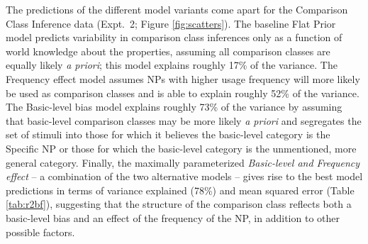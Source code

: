 \documentclass[doc]{apa6}
\begin{document}
The predictions of the different model variants come apart for the Comparison Class Inference data (Expt.~2; Figure \ref{fig:scatters}). 
The baseline Flat Prior model predicts variability in comparison class inferences only as a function of world knowledge about the properties, assuming all comparison classes are equally likely \emph{a priori}; this model explains roughly 17\% of the variance.
The Frequency effect model assumes NPs with higher usage frequency will more likely be used as comparison classes and is able to explain roughly 52\% of the variance.
The Basic-level bias model explains roughly 73\% of the variance by assuming that basic-level comparison classes may be more likely \emph{a priori} and segregates the set of stimuli into those for which it believes the basic-level category is the Specific NP or those for which the basic-level category is the unmentioned, more general category. 
Finally, the maximally parameterized \emph{Basic-level and Frequency effect} -- a combination of the two alternative models -- gives rise to the best model predictions in terms of variance explained (78\%) and mean squared error (Table \ref{tab:r2bf}), suggesting that the structure of the comparison class reflects both a basic-level bias and an effect of the frequency of the NP, in addition to other possible factors. 



\end{document}
